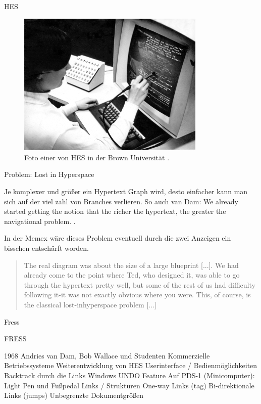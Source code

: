 \begin{section}{HES}
\begin{figure}[!ht]
	\centering
	\includegraphics[width=0.8\textwidth]{image/hes}
	\caption{Foto einer von HES in der Brown Universität \cite{Lloyd1969}.}
	\label{fig:hes}
\end{figure}

\end{section}

\begin{section}{Problem: Lost in Hyperspace}
\label{sec:lostInHyperspace}

Je komplexer und größer ein Hypertext Graph wird, desto einfacher kann man sich auf der viel zahl von Branches verlieren. So auch van Dam: \glqq We already started getting the notion that the richer the hypertext, the greater the navigational problem. \grqq{ }\cite{Dam1988}.

In der Memex wäre dieses Problem eventuell durch die zwei Anzeigen ein bisschen entschärft worden. 

\begin{quote}
\glqq [...] The real diagram was about the size of a large blueprint [...]. We had already come to the point where Ted, who designed it, was able to go through the hypertext pretty well, but some of the rest of us had difficulty following it-it was not exactly obvious where you were. This, of course, is the classical lost-inhyperspace problem [...]\grqq{ }\cite{Dam1988}
\end{quote}

\end{section}

\begin{section}{Fress}
\label{sec:fress}
	
FRESS

1968
Andries van Dam, Bob Wallace und Studenten
Kommerzielle Betriebssysteme
Weiterentwicklung von HES
Userinterface / Bedienmöglichkeiten
Backtrack durch die Links
Windows
UNDO Feature
Auf PDS-1 (Minicomputer): Light Pen und Fußpedal
Links / Strukturen
One-way Links (tag)
Bi-direktionale Links (jumps)
Unbegrenzte Dokumentgrößen

\end{section}